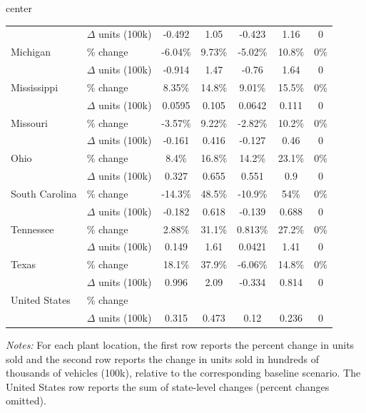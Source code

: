 \begin{table}[!htbp]
\begin{adjustbox}{center}
\begin{threeparttable}
\begin{tabular}{llccccc}
        & $\Delta$ units (100k) & -0.492 & 1.05 & -0.423 & 1.16 & 0 \\
\addlinespace[2pt]
Michigan & \% change             & -6.04\% & 9.73\% & -5.02\% & 10.8\% & 0\% \\
        & $\Delta$ units (100k) & -0.914 & 1.47 & -0.76 & 1.64 & 0 \\
\addlinespace[2pt]
Mississippi & \% change             & 8.35\% & 14.8\% & 9.01\% & 15.5\% & 0\% \\
        & $\Delta$ units (100k) & 0.0595 & 0.105 & 0.0642 & 0.111 & 0 \\
\addlinespace[2pt]
Missouri & \% change             & -3.57\% & 9.22\% & -2.82\% & 10.2\% & 0\% \\
        & $\Delta$ units (100k) & -0.161 & 0.416 & -0.127 & 0.46 & 0 \\
\addlinespace[2pt]
Ohio & \% change             & 8.4\% & 16.8\% & 14.2\% & 23.1\% & 0\% \\
        & $\Delta$ units (100k) & 0.327 & 0.655 & 0.551 & 0.9 & 0 \\
\addlinespace[2pt]
South Carolina & \% change             & -14.3\% & 48.5\% & -10.9\% & 54\% & 0\% \\
        & $\Delta$ units (100k) & -0.182 & 0.618 & -0.139 & 0.688 & 0 \\
\addlinespace[2pt]
Tennessee & \% change             & 2.88\% & 31.1\% & 0.813\% & 27.2\% & 0\% \\
        & $\Delta$ units (100k) & 0.149 & 1.61 & 0.0421 & 1.41 & 0 \\
\addlinespace[2pt]
Texas & \% change             & 18.1\% & 37.9\% & -6.06\% & 14.8\% & 0\% \\
        & $\Delta$ units (100k) & 0.996 & 2.09 & -0.334 & 0.814 & 0 \\
\addlinespace[2pt]
\midrule
United States & \% change             &  &  &  &  &  \\
              & $\Delta$ units (100k) & 0.315 & 0.473 & 0.12 & 0.236 & 0 \\
\bottomrule
\end{tabular}

\begin{tablenotes}[flushleft]\footnotesize
\item \textit{Notes:} For each plant location, the first row reports the percent change in units sold and the second row reports the change in units sold in hundreds of thousands of vehicles (100k), relative to the corresponding baseline scenario. The United States row reports the sum of state-level changes (percent changes omitted).
\end{tablenotes}
\end{threeparttable}
\end{adjustbox}

\end{table}
